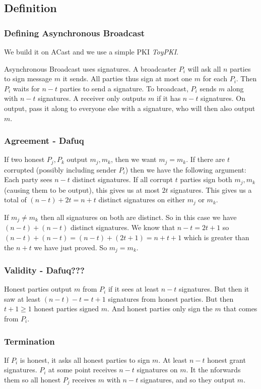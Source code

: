     \subsection{Definition}
    \begin{frame}
        \frametitle{Defining Asynchronous Broadcast}
            We build it on ACast and we use a simple PKI \textit{ToyPKI}. 

            Asynchronous Broadcast uses signatures. A broadcaster $P_i$ will ask all $n$ parties to sign message $m$ it sends. All parties thus sign at most one $m$ for each $P_i$. Then $P_i$ waits for $n - t$ parties to send a signature. To broadcast, $P_i$ sends $m$ along with $n -t$ signatures. A receiver only outputs $m$ if it has $n - t$ signatures. On output, pass it along to everyone else with a signature, who will then also output $m$. 
    \end{frame}
    \begin{frame}
        \frametitle{Agreement - Dafuq}
            If two honest $P_j, P_k$ output $m_j, m_k$, then we want $m_j = m_k$. If there are $t$ corrupted (possibly including sender $P_i$) then we have the following argument: 
            Each party sees $n - t$ distinct signatures. If all corrupt $t$ parties sign both $m_j, m_k$ (causing them to be output), this gives us at most $2t$ signatures. This gives us a total of $(n -t) + 2t = n+t$ distinct signatures on either $m_j$ or $m_k$. 

            If $m_j \neq m_k$ then all signatures on both are distinct. So in this case we have $(n-t) + (n-t)$ distinct signatures. We know that $n-t = 2t +1$ so $(n-t) + (n-t) = (n-t) + (2t + 1) = n + t +1$ which is greater than the $n+t$ we have just proved. So $m_j = m_k$.
    \end{frame}

    \begin{frame}
        \frametitle{Validity - Dafuq???}
            Honest parties output $m$ from $P_i$ if it sees at least $n -t$ signatures. But then it saw at least $(n-t) - t = t + 1$ signatures from honest parties. But then $t + 1 \geq 1$ honest parties signed $m$. And honest parties only sign the $m$ that comes from $P_i$.
    \end{frame}

    \begin{frame}
        \frametitle{Termination}
            If $P_i$ is honest, it asks all honest parties to sign $m$. At least $n-t$ honest grant signatures. $P_i$ at some point receives $n-t$ signatures on $m$. It the nforwards them so all honest $P_j$ receives $m$ with $n-t$ signatures, and so they output $m$.
    \end{frame}

